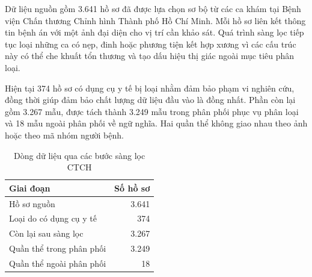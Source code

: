 \begin{table}[H]
\centering
\caption{Đặc điểm kỹ thuật của các tệp ảnh CTCH}
\label{tab:appendix-ctch-image-properties}
\small
{}
\end{table}

Dữ liệu nguồn gồm 3.641 hồ sơ đã được lựa chọn sơ bộ từ các ca khám tại Bệnh viện Chấn thương Chỉnh hình Thành phố Hồ Chí Minh. Mỗi hồ sơ liên kết thông tin bệnh án với một ảnh đại diện cho vị trí cần khảo sát. Quá trình sàng lọc tiếp tục loại những ca có nẹp, đinh hoặc phương tiện kết hợp xương vì các cấu trúc này có thể che khuất tổn thương và tạo dấu hiệu thị giác ngoài mục tiêu phân loại.

Hiện tại 374 hồ sơ có dụng cụ y tế bị loại nhằm đảm bảo phạm vi nghiên cứu, đồng thời giúp đảm bảo chất lượng dữ liệu đầu vào là đồng nhất. Phần còn lại gồm 3.267 mẫu, được tách thành 3.249 mẫu trong phân phối phục vụ phân loại và 18 mẫu ngoài phân phối về ngữ nghĩa. Hai quần thể không giao nhau theo ảnh hoặc theo mã nhóm người bệnh.

\begin{table}[H]
\centering
\caption{Dòng dữ liệu qua các bước sàng lọc CTCH}
\label{tab:appendix-ctch-cohort-flow}
\small
\begin{tabular}{|l|r|}
\hline
\textbf{Giai đoạn} & \textbf{Số hồ sơ} \\ \hline
Hồ sơ nguồn & 3.641 \\ \hline
Loại do có dụng cụ y tế & 374 \\ \hline
Còn lại sau sàng lọc & 3.267 \\ \hline
Quần thể trong phân phối & 3.249 \\ \hline
Quần thể ngoài phân phối & 18 \\ \hline
\end{tabular}%
\end{table}

